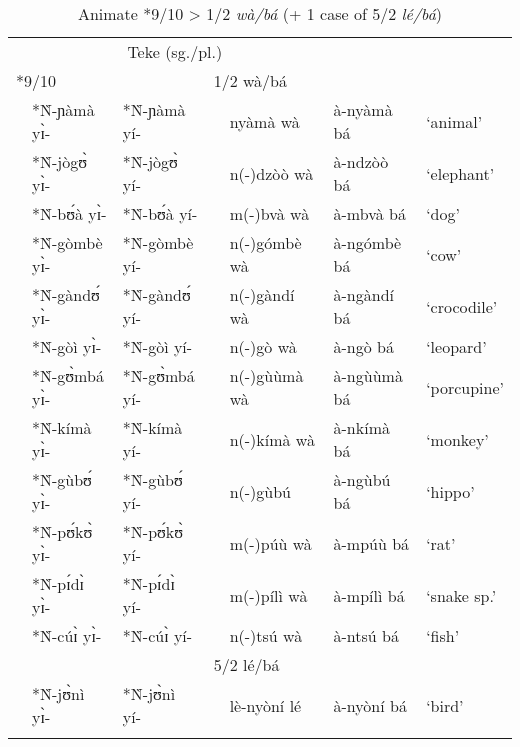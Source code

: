 \documentclass[output=paper,,modfonts,nonflat]{langsci/langscibook}
\begin{document}
\begin{table}
\caption{Animate *9/10 > 1/2 \textit{wà/bá} (+ 1 case of 5/2 \textit{lé/bá})}
\label{table11}
\begin{small}
\begin{tabular}{l		l l l  		l		l		l}
\lsptoprule														
\multicolumn{3}{c}{PB (sg./pl.)}					&	\multicolumn{4}{c}{Teke (sg./pl.)}\\	
\cmidrule(r){1-3}\cmidrule(l){4-7}
\multicolumn{2}{l}{*9/10}			&		&	\multicolumn{2}{l}{1/2 wà/bá}			&		&		\\	
	&	*Ǹ-ɲàmà yɪ̀-	&	*Ǹ-ɲàmà yí-	&		&	nyàmà wà	&	à-nyàmà bá	&	`animal’	\\	
	&	*Ǹ-jògʊ̀ yɪ̀-	&	*Ǹ-jògʊ̀ yí-	&		&	n(-)dzòò wà	&	à-ndzòò bá	&	`elephant’	\\	
	&	*Ǹ-bʊ́à yɪ̀-	&	*Ǹ-bʊ́à yí-	&		&	m(-)bvà wà	&	à-mbvà bá	&	`dog’	\\	
	&	*Ǹ-gòmbè yɪ̀-	&	*Ǹ-gòmbè yí-	&		&	n(-)gómbè wà	&	à-ngómbè bá	&	`cow’	\\	
	&	*Ǹ-gàndʊ́ yɪ̀-	&	*Ǹ-gàndʊ́ yí-	&		&	n(-)gàndí wà	&	à-ngàndí bá	&	`crocodile’	\\	
	&	*Ǹ-gòì yɪ̀-	&	*Ǹ-gòì yí-	&		&	n(-)gò wà	&	à-ngò bá	&	`leopard’	\\	
	&	*Ǹ-gʊ̀mbá yɪ̀-	&	*Ǹ-gʊ̀mbá yí-	&		&	n(-)gùùmà wà	&	à-ngùùmà bá	&	`porcupine’	\\	
	&	*Ǹ-kímà yɪ̀-	&	*Ǹ-kímà yí-	&		&	n(-)kímà wà	&	à-nkímà bá	&	`monkey’	\\	
	&	*Ǹ-gùbʊ́ yɪ̀-	&	*Ǹ-gùbʊ́ yí-	&		&	n(-)gùbú	&	à-ngùbú bá	&	`hippo’	\\	
	&	*Ǹ-pʊ́kʊ̀ yɪ̀-	&	*Ǹ-pʊ́kʊ̀ yí-	&		&	m(-)púù wà	&	à-mpúù bá	&	`rat’	\\	
	&	*Ǹ-pɪ́dɪ̀ yɪ̀-	&	*Ǹ-pɪ́dɪ̀ yí-	&		&	m(-)pílì wà	&	à-mpílì bá	&	`snake sp.’	\\	
	&	*Ǹ-cúɪ̀ yɪ̀-	&	*Ǹ-cúɪ̀ yí-	&		&	n(-)tsú wà	&	à-ntsú bá	&	`fish’	\\	[0.2cm]
	&		&		&	\multicolumn{2}{l}{5/2 lé/bá}			&		&		\\	
	&	*Ǹ-jʊ̀nì yɪ̀-	&	*Ǹ-jʊ̀nì yí-	&		&	lè-nyòní lé	&	à-nyòní bá	&	`bird’	\\	
\lspbottomrule
\end{tabular}
\end{small}	
\end{table}
\end{document}
